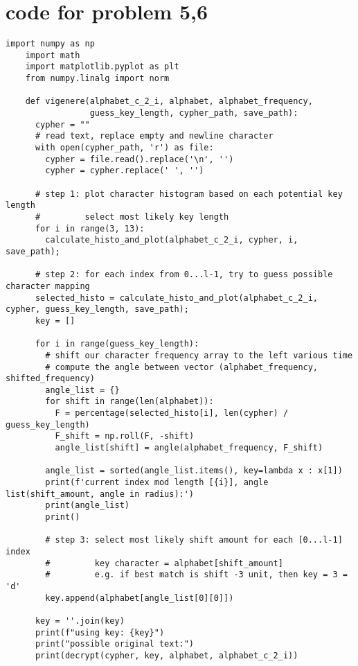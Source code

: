 \documentclass[12pt,letterpaper]{article}
\begin{document}
  \clearpage
  \section*{code for problem 5,6}
  \begin{lstlisting}[style = Python]
    import numpy as np
    import math
    import matplotlib.pyplot as plt
    from numpy.linalg import norm
    
    def vigenere(alphabet_c_2_i, alphabet, alphabet_frequency, 
                 guess_key_length, cypher_path, save_path):
      cypher = ""
      # read text, replace empty and newline character
      with open(cypher_path, 'r') as file:
        cypher = file.read().replace('\n', '')
        cypher = cypher.replace(' ', '')
    
      # step 1: plot character histogram based on each potential key length
      #         select most likely key length
      for i in range(3, 13):
        calculate_histo_and_plot(alphabet_c_2_i, cypher, i, save_path);
    
      # step 2: for each index from 0...l-1, try to guess possible character mapping
      selected_histo = calculate_histo_and_plot(alphabet_c_2_i, cypher, guess_key_length, save_path);
      key = []

      for i in range(guess_key_length):
        # shift our character frequency array to the left various time 
        # compute the angle between vector (alphabet_frequency, shifted_frequency)
        angle_list = {}
        for shift in range(len(alphabet)):
          F = percentage(selected_histo[i], len(cypher) / guess_key_length)
          F_shift = np.roll(F, -shift)
          angle_list[shift] = angle(alphabet_frequency, F_shift)
    
        angle_list = sorted(angle_list.items(), key=lambda x : x[1])
        print(f'current index mod length [{i}], angle list(shift_amount, angle in radius):')
        print(angle_list)
        print()
    
        # step 3: select most likely shift amount for each [0...l-1] index
        #         key character = alphabet[shift_amount]
        #         e.g. if best match is shift -3 unit, then key = 3 = 'd'
        key.append(alphabet[angle_list[0][0]])
    
      key = ''.join(key)
      print(f"using key: {key}")
      print("possible original text:")
      print(decrypt(cypher, key, alphabet, alphabet_c_2_i))
      
      
    

\end{lstlisting}
\end{document}
